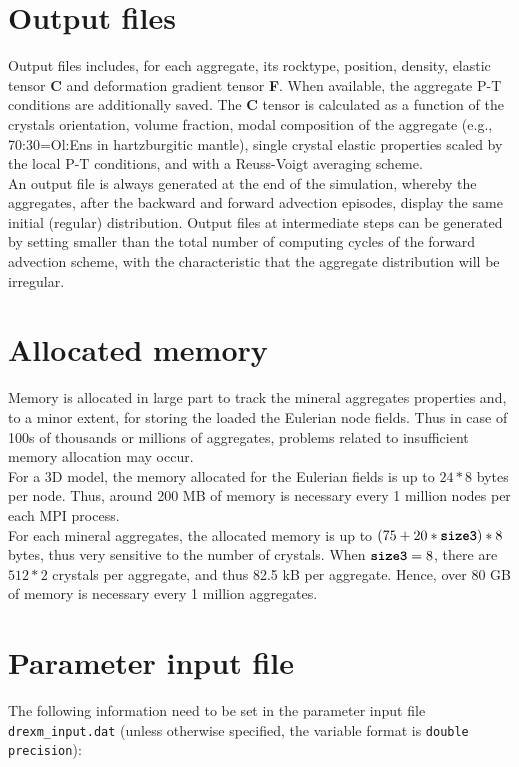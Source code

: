 \section{Output \cijkltitle{} files}
Output files includes, for each aggregate, its rocktype, position, density, elastic tensor \textbf{C} and deformation gradient tensor \textbf{F}. When available, the aggregate P-T conditions are additionally saved.
The \textbf{C} tensor is calculated as a function of the crystals orientation, volume fraction, modal composition of the aggregate (e.g., 70:30=Ol:Ens in hartzburgitic mantle), single crystal elastic properties scaled by the local P-T conditions, and with a Reuss-Voigt averaging scheme.\\
An output \cijkltitle{} file is always generated at the end of the simulation, whereby the aggregates, after the backward and forward advection episodes, display the same initial (regular) distribution. Output files at intermediate steps can be generated by setting  smaller than the total number of computing cycles of the forward advection scheme, with the characteristic that the aggregate distribution will be irregular. 

\section{Allocated memory}
Memory is allocated in large part to track the mineral aggregates properties and, to a minor extent, for storing the loaded the Eulerian node fields. Thus in case of 100s of thousands or millions of aggregates, problems related to insufficient memory allocation may occur.\\
For a 3D model, the memory allocated for the Eulerian fields is up to $24*8$ bytes per node. Thus, around 200 MB of memory is necessary every 1 million nodes per each MPI process.\\
For each mineral aggregates, the allocated memory is up to $(75 + 20*\textbf{\texttt{size3}})*8$ bytes, thus very sensitive to the number of crystals. When $\textbf{\texttt{size3}}=8$, there are $512*2$ crystals per aggregate, and thus 82.5 kB per aggregate. Hence, over 80 GB of memory is necessary every 1 million aggregates.

\section{Parameter input file}
\label{section:modelsetup}

The following information need to be set in the parameter  input file \texttt{drexm\_input.dat} (unless otherwise specified, the variable format is \texttt{double precision}):

